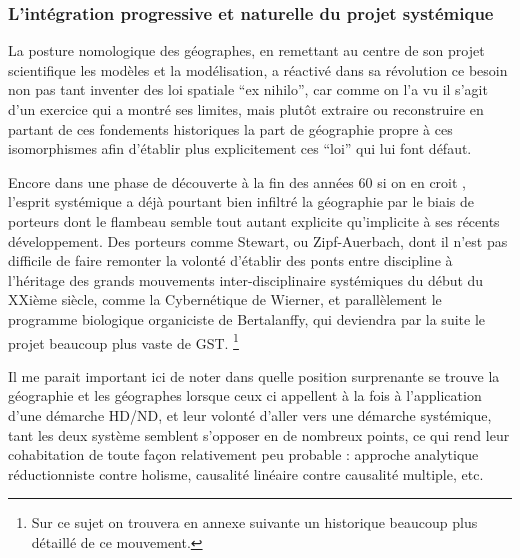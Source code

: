 
\subsubsection{L'intégration progressive et naturelle du projet systémique} 
\label{sssec:progressive_systemique}

La posture nomologique des géographes, en remettant au centre de son projet scientifique les modèles et la modélisation, a réactivé dans sa révolution ce besoin non pas tant inventer des loi spatiale \foreignquote{latin}{ex nihilo}, car comme on l'a vu il s'agit d'un exercice qui a montré ses limites, mais plutôt extraire ou reconstruire en partant de ces fondements historiques la part de géographie propre à ces isomorphismes afin d'établir plus explicitement ces \enquote{loi} qui lui font défaut.

Encore dans une phase de découverte à la fin des années 60 si on en croit \textcite{Harvey1969}, l'esprit systémique \textcite{Ackerman1963} a déjà pourtant bien infiltré la géographie par le biais de porteurs dont le flambeau semble tout autant explicite qu'implicite à ses récents développement. Des porteurs comme Stewart, ou Zipf-Auerbach, dont il n'est pas difficile de faire remonter la volonté d'établir des ponts entre discipline à l'héritage des grands mouvements inter-disciplinaire systémiques du début du XXième siècle, comme la Cybernétique de Wierner, et parallèlement le programme biologique organiciste de Bertalanffy, qui deviendra par la suite le projet beaucoup plus vaste de GST. \footnote{Sur ce sujet on trouvera en annexe suivante un historique beaucoup plus détaillé de ce mouvement.} 

Il me parait important ici de noter dans quelle position surprenante se trouve la géographie et les géographes lorsque ceux ci appellent à la fois à l'application d'une démarche HD/ND, et leur volonté d'aller vers une démarche systémique, tant les deux système semblent s'opposer en de nombreux points, ce qui rend leur cohabitation de toute façon relativement peu probable : approche analytique réductionniste contre holisme, causalité linéaire contre causalité multiple, etc. 

